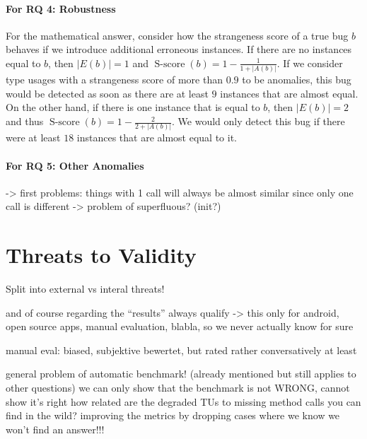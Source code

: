 \paragraph{For RQ 4: Robustness}

For the mathematical answer, consider how the strangeness score of a true bug $b$ behaves if we introduce additional erroneous instances.
If there are no instances equal to $b$, then $|E(b)|=1$ and $\operatorname{S-score}(b)=1-\frac{1}{1+|A(b)|}$.
If we consider type usages with a strangeness score of more than $0.9$ to be anomalies, this bug would be detected as soon as there are at least $9$ instances that are almost equal.
On the other hand, if there is one instance that is equal to $b$, then $|E(b)|=2$ and thus $\operatorname{S-score}(b)=1-\frac{2}{2+|A(b)|}$.
We would only detect this bug if there were at least $18$ instances that are almost equal to it.

\paragraph{For RQ 5: Other Anomalies}

    -> first problems: things with 1 call will always be almost similar since only one call is different
    -> problem of superfluous? (init?)

\section{Threats to Validity}

Split into external vs interal threats!

and of course regarding the ``results'' always qualify -> this only for android, open source apps, manual evaluation, blabla, so we never actually know for sure

manual eval: biased, subjektive bewertet, but rated rather conversatively at least

general problem of automatic benchmark! (already mentioned but still applies to other questions)
    we can only show that the benchmark is not WRONG, cannot show it's right
how related are the degraded TUs to missing method calls you can find in the wild?
improving the metrics by dropping cases where we know we won't find an answer!!!

